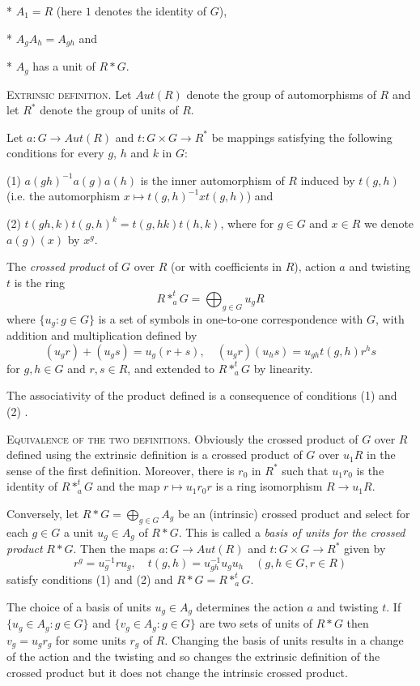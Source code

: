 \documentclass[a4paper,11pt]{report}
\begin{document}
{{ * $A_1=R$ (here $1$ denotes the identity of $G$),

 * $A_g A_h = A_{gh}$ and 

 * $A_g$ has a unit of $R*G$.

 \textsc{Extrinsic definition}. Let $Aut(R)$ denote the group of automorphisms of $R$ and let $R^*$ denote the group of units of $R$.

 Let $a:G \rightarrow Aut(R)$ and $t:G \times G \rightarrow R^*$ be mappings satisfying the following conditions for every $g$, $h$ and $k$ in $G$: 

 (1) $a(gh)^{-1} a(g) a(h)$ is the inner automorphism of $R$ induced by $t(g,h)$ (i.e. the automorphism $x\mapsto t(g,h)^{-1} x t(g,h)$) and 

 (2) $t(gh,k) t(g,h)^k = t(g,hk) t(h,k)$, where for $g \in G$ and $x \in R$ we denote $a(g)(x)$ by $x^g$. 

 The \emph{crossed product} \cite{P} of $G$ over $R$ (or with coefficients in $R$), action $a$ and twisting $t$ is the ring 
\[ R*_a^t G = \bigoplus_{g\in G} u_g R \]
 where $\{u_g : g\in G \}$ is a set of symbols in one-to-one correspondence with $G$, with addition and multiplication defined by 
\[ (u_g r) + (u_g s) = u_g(r+s), \quad (u_g r)(u_h s) = u_{gh} t(g,h) r^h s \]
 for $g,h \in G$ and $r,s\in R$, and extended to $R*_a^t G$ by linearity.

 The associativity of the product defined is a consequence of conditions (1)
and (2) \cite{P}.

 \textsc{Equivalence of the two definitions}. Obviously the crossed product of $G$ over $R$ defined using the extrinsic definition is a crossed product of $G$ over $u_1 R$ in the sense of the first definition. Moreover, there is $r_0$ in $R^*$ such that $u_1r_0$ is the identity of $R*_a^t G$ and the map $r \mapsto u_1 r_0 r $ is a ring isomorphism $R \rightarrow u_1R $. 

  Conversely, let $R*G=\bigoplus_{g\in G} A_g$ be an (intrinsic) crossed product and select for each $g\in G$ a unit $u_g\in A_g$ of $R*G$. This is called a \emph{basis of units for the crossed product} $R*G$. Then the maps $a:G \rightarrow Aut(R)$ and $t:G\times G \rightarrow R^*$ given by 
\[ r^g = u_g^{-1} r u_g, \quad t(g,h) = u_{gh}^{-1} u_g u_h \quad (g,h \in G, r
\in R) \]
 satisfy conditions (1) and (2) and $R*G = R*_a^t G$. 

 The choice of a basis of units $u_g \in A_g$ determines the action $a$ and twisting $t$. If $\{u_g \in A_g : g \in G \}$ and $\{v_g \in A_g : g \in G \}$ are two sets of units of $R*G$ then $v_g = u_g r_g$ for some units $r_g$ of $R$. Changing the basis of units results in a change of the action and the
twisting and so changes the extrinsic definition of the crossed product but it
does not change the intrinsic crossed product. 

}}
\end{document}
